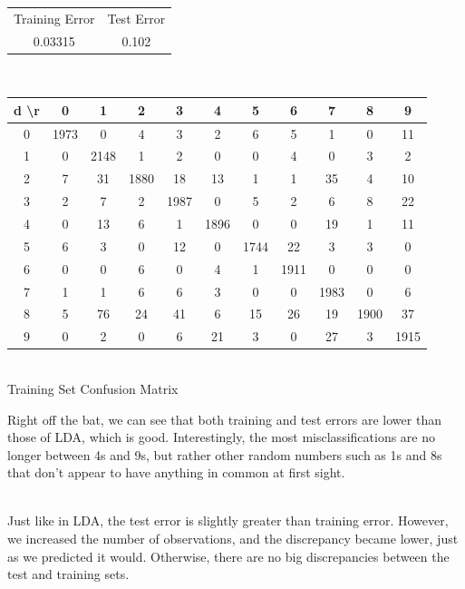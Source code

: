 \documentclass[10pt]{extarticle}
\begin{document}
\begin{center}
	\begin{tabular}{c c}
		Training Error & Test Error\\
		0.03315 & 0.102
	\end{tabular}\\
\end{center}
\begin{minipage}{.7\textwidth}
	\begin{center}
	\begin{tabular}{c | c c c c c c c c c c}
		d \textbackslash r&0&1&2&3&4&5&6&7&8&9\\ \hline
		0&1973&0&4&3&2&6&5&1&0&11\\
		1&0&2148&1&2&0&0&4&0&3&2\\
		2&7&31&1880&18&13&1&1&35&4&10\\
		3&2&7&2&1987&0&5&2&6&8&22\\
		4&0&13&6&1&1896&0&0&19&1&11\\
		5&6&3&0&12&0&1744&22&3&3&0\\
		6&0&0&6&0&4&1&1911&0&0&0\\
		7&1&1&6&6&3&0&0&1983&0&6\\
		8&5&76&24&41&6&15&26&19&1900&37\\
		9&0&2&0&6&21&3&0&27&3&1915
	\end{tabular}\\
	\bigskip 
	Training Set Confusion Matrix
	\end{center}
	\textrm{ }
\end{minipage}
\begin{minipage}{.3\textwidth}
Right off the bat, we can see that both training and test errors are lower than those of LDA, which is good. Interestingly, the most misclassifications are no longer between 4s and 9s, but rather other random numbers such as 1s and 8s that don't appear to have anything in common at first sight.\\\\
\end{minipage}
\begin{minipage}{.35\textwidth}
	Just like in LDA, the test error is slightly greater than training error. However, we increased the number of observations, and the discrepancy became lower, just as we predicted it would. Otherwise, there are no big discrepancies between the test and training sets.
\end{minipage}
\begin{minipage}{.05\textwidth}
	\quad
\end{minipage}
\end{document}
